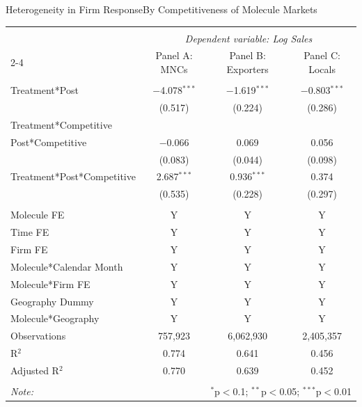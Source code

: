 \documentclass[aspectratio=43]{beamer}
\begin{document}
\begin{frame}[label= FirmCompHetero4]{Heterogeneity in Firm Response}{By Competitiveness of Molecule Markets}
	\begin{table}[H] \centering 
		\tiny 
		\begin{tabular}{@{\extracolsep{3pt}}lccc} 
			\\[-1.8ex]\hline 
			\hline \\[-1.8ex] 
			& \multicolumn{3}{c}{\textit{Dependent variable: Log Sales}} \\ 
			\cline{2-4} 
			& Panel A: MNCs & Panel B: Exporters & Panel C: Locals \\ 
			\hline \\[-1.8ex] 
			Treatment*Post & $-$4.078$^{***}$ & $-$1.619$^{***}$ & $-$0.803$^{***}$ \\ 
			& (0.517) & (0.224) & (0.286) \\ 
			Treatment*Competitive &  &  &  \\ 
			Post*Competitive & $-$0.066 & 0.069 & 0.056 \\ 
			& (0.083) & (0.044) & (0.098) \\ 
			Treatment*Post*Competitive & 2.687$^{***}$ & 0.936$^{***}$ & 0.374 \\ 
			& (0.535) & (0.228) & (0.297) \\ 
			\hline \\[-1.8ex] 
			Molecule FE & Y & Y & Y \\ 
			Time FE & Y & Y & Y \\ 
			Firm FE & Y & Y & Y \\ 
			Molecule*Calendar Month & Y & Y & Y \\ 
			Molecule*Firm FE & Y & Y & Y \\ 
			Geography Dummy & Y & Y & Y \\ 
			Molecule*Geography & Y & Y & Y \\ 
			Observations & 757,923 & 6,062,930 & 2,405,357 \\ 
			R$^{2}$ & 0.774 & 0.641 & 0.456 \\ 
			Adjusted R$^{2}$ & 0.770 & 0.639 & 0.452 \\ 
			\hline 
			\hline \\[-1.8ex] 
			\textit{Note:}  & \multicolumn{3}{r}{$^{*}$p$<$0.1; $^{**}$p$<$0.05; $^{***}$p$<$0.01} \\ 
		\end{tabular} 
	\end{table} 
\end{frame}
\end{document}
